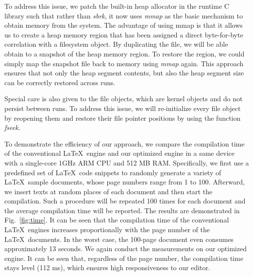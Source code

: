 \documentclass[]{sigchi}
\begin{document}

To address this issue, we patch the built-in heap allocator in the runtime C library such that rather than \textit{sbrk}, it now uses \textit{mmap} as the basic mechanism to obtain memory from the system. The advantage of using mmap is that it allows us to create a heap memory region that has been assigned a direct byte-for-byte correlation with a filesystem object. By duplicating the file, we will be able obtain to a snapshot of the heap memory region. To restore the region, we could simply map the snapshot file back to memory using \textit{mmap} again. This approach ensures that not only the heap segment contents, but also the heap segment size can be correctly restored across runs. 


Special care is also given to the file objects, which are kernel objects and do not persist between runs. To address this issue, we will re-initialize every file object by reopening them and restore their file pointer positions by using the function \textit{fseek}.



To demonstrate the efficiency of our approach, we compare the compilation time of the conventional \LaTeX\ engine and our optimized engine in a same device with a single-core 1GHz ARM CPU and 512 MB RAM. Specifically, we first use a predefined set of \LaTeX\ code snippets to randomly generate a variety of \LaTeX\ sample documents, whose page numbers range from 1 to 100. Afterward,  
we insert texts at random places of each document and then start the compilation. Such a procedure will be repeated 100 times for each document and the average compilation time will be reported. 
The results are demonstrated in Fig.~\ref{fig:time}. It can be seen that the compilation time of the conventional \LaTeX\ engines increases proportionally with the page number of the \LaTeX\ documents. In the worst case, the 100-page document even consumes approximately 13 seconds.
We again conduct the measurements on our optimized engine. It can be seen that, regardless of the page number, the compilation time stays level (112 ms), which ensures high responsiveness to our editor. 
\end{document}
